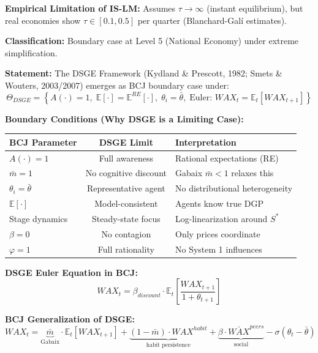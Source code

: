 \begin{tcolorbox}[colback=gray!10!white, colframe=gray!75!black,
    title=Theorem BCJ-T25: IS-LM as Boundary Case]
\textbf{Empirical Limitation of IS-LM:} Assumes $\tau \to \infty$ (instant equilibrium), but real economies show $\tau \in [0.1, 0.5]$ per quarter (Blanchard-Galí estimates).

\textbf{Classification:} Boundary case at Level 5 (National Economy) under extreme simplification.
\end{tcolorbox}

\begin{tcolorbox}[colback=gray!10!white, colframe=gray!75!black,
    title=Theorem BCJ-T26: DSGE as Boundary Case]
\textbf{Statement:} The DSGE Framework (Kydland \& Prescott, 1982; Smets \& Wouters, 2003/2007) emerges as BCJ boundary case under:
\begin{equation}
\Theta_{DSGE} = \left\{A(\cdot) = 1, \; \mathbb{E}[\cdot] = \mathbb{E}^{RE}[\cdot], \; \theta_i = \bar{\theta}, \; \text{Euler: } WAX_t = \mathbb{E}_t[WAX_{t+1}]\right\}
\end{equation}

\textbf{Boundary Conditions (Why DSGE is a Limiting Case):}
\begin{center}
\begin{tabular}{lcp{6.5cm}}
\toprule
\textbf{BCJ Parameter} & \textbf{DSGE Limit} & \textbf{Interpretation} \\
\midrule
$A(\cdot) = 1$ & Full awareness & Rational expectations (RE) \\
$\bar{m} = 1$ & No cognitive discount & Gabaix $\bar{m} < 1$ relaxes this \\
$\theta_i = \bar{\theta}$ & Representative agent & No distributional heterogeneity \\
$\mathbb{E}[\cdot]$ & Model-consistent & Agents know true DGP \\
Stage dynamics & Steady-state focus & Log-linearization around $S^*$ \\
$\beta = 0$ & No contagion & Only prices coordinate \\
$\varphi = 1$ & Full rationality & No System 1 influences \\
\bottomrule
\end{tabular}
\end{center}

\textbf{DSGE Euler Equation in BCJ:}
\begin{equation}
WAX_t = \beta_{discount} \cdot \mathbb{E}_t\left[\frac{WAX_{t+1}}{1 + \theta_{t+1}}\right]
\end{equation}

\textbf{BCJ Generalization of DSGE:}
\begin{equation}
WAX_t = \underbrace{\bar{m}}_{\text{Gabaix}} \cdot \mathbb{E}_t[WAX_{t+1}] + \underbrace{(1-\bar{m}) \cdot WAX^{habit}}_{\text{habit persistence}} + \underbrace{\beta \cdot \bar{WAX}^{peers}}_{\text{social}} - \sigma(\theta_t - \bar{\theta})
\end{equation}


\end{tcolorbox}
